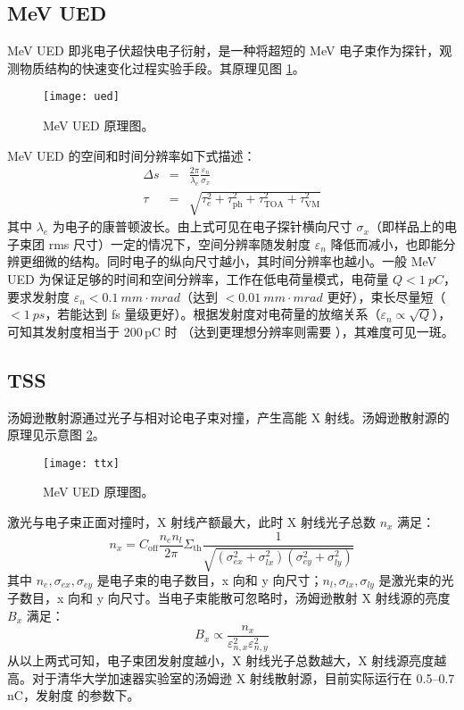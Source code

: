 \subsection{MeV UED}
MeV UED 即兆电子伏超快电子衍射，是一种将超短的 MeV 电子束作为探针，观测物质结构的快速变化过程实验手段。其原理见图 \ref{fig:ued}。
\begin{figure}[htbp]
\centering
\texttt{[image: ued]}
\caption{\label{fig:ued} MeV UED 原理图\cite{Li:aa}。}
\end{figure}

MeV UED 的空间和时间分辨率如下式描述\cite{Weathersby:2015aa}：
\begin{eqnarray}
\Delta s &=& \frac{2\pi}{\lambda_e}\frac{\varepsilon_n}{\sigma_x}\\
\tau &=& \sqrt{\tau_e^2+\tau_{\text{ph}}^2+\tau_{\text{TOA}}^2+\tau_{\text{VM}}^2}
\end{eqnarray}
其中 $\lambda_e$ 为电子的康普顿波长。由上式可见在电子探针横向尺寸 $\sigma_x$（即样品上的电子束团 rms 尺寸）一定的情况下，空间分辨率随发射度 $\varepsilon_{n}$ 降低而减小，也即能分辨更细微的结构。同时电子的纵向尺寸越小，其时间分辨率也越小。一般 MeV UED 为保证足够的时间和空间分辨率，工作在低电荷量模式，电荷量 $Q < \SI{1}{pC}$，要求发射度 $\varepsilon_{n} < \SI{0.1}{mm\cdot mrad}$（达到 $<\SI{0.01}{mm\cdot mrad}$ 更好），束长尽量短（$<\SI{1}{ps}$，若能达到 fs 量级更好）。根据发射度对电荷量的放缩关系（$\varepsilon_n\propto\sqrt{Q}$），可知其发射度相当于 200\,pC 时 （达到更理想分辨率则需要 ），其难度可见一斑。

\subsection{TSS}
汤姆逊散射源通过光子与相对论电子束对撞，产生高能 X 射线\cite{Milburn:1963aa,Fiocco:1963aa}。汤姆逊散射源的原理见示意图 \ref{fig:ttx}。
\begin{figure}[htbp]
\centering
\texttt{[image: ttx]}
\caption{\label{fig:ttx} MeV UED 原理图。}
\end{figure}

激光与电子束正面对撞时，X 射线产额最大，此时 X 射线光子总数 $n_x$ 满足\cite{huangwenhui:2004aa}：
\begin{equation}
n_x = C_{\text{off}}\frac{n_en_l}{2\pi}\Sigma_{\text{th}}\frac{1}{\sqrt{(\sigma_{ex}^2+\sigma_{lx}^2)(\sigma_{ey}^2+\sigma_{ly}^2)}}
\end{equation}
其中 $n_e, \sigma_{ex}, \sigma_{ey}$ 是电子束的电子数目，x 向和 y 向尺寸；$n_l, \sigma_{lx}, \sigma_{ly}$ 是激光束的光子数目，x 向和 y 向尺寸。当电子束能散可忽略时，汤姆逊散射 X 射线源的亮度 $B_x$ 满足\cite{duyingchao:2006aa}：
\begin{equation}
B_x \propto \frac{n_x}{\varepsilon_{n, x}^2\varepsilon_{n, y}^2}
\end{equation}
从以上两式可知，电子束团发射度越小，X 射线光子总数越大，X 射线源亮度越高。对于清华大学加速器实验室的汤姆逊 X 射线散射源，目前实际运行在 0.5--0.7\,nC，发射度  的参数下\cite{Qian:2012aa}。

